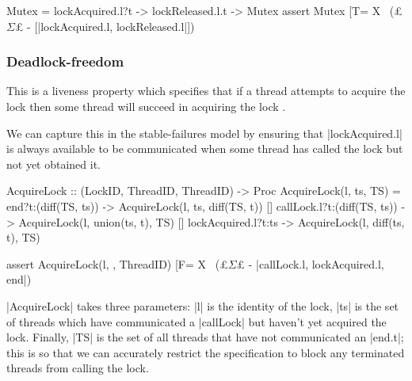   
  \begin{cspm}
Mutex = lockAcquired.l?t -> lockReleased.l.t -> Mutex
assert Mutex [T= 
          X \ (£$\Sigma$£ - [|lockAcquired.l, lockReleased.l|])
  \end{cspm}

\subsubsection{Deadlock-freedom}\label{deadlock-freedom}
This is a liveness property which specifies that if a thread attempts to acquire the lock then some thread will succeed in acquiring the lock \cite{TAoMP}. 

  
  

  We can capture this in the stable-failures model by ensuring that |lockAcquired.l| is always available to be communicated when some thread has called the lock but not yet obtained it. %

  \begin{cspm}
AcquireLock :: (LockID, {ThreadID}, {ThreadID}) -> Proc
AcquireLock(l, ts, TS) = 
     end?t:(diff(TS, ts)) -> AcquireLock(l, ts, diff(TS, {t})) 
  [] callLock.l?t:(diff(TS, ts)) -> AcquireLock(l, union(ts, {t}), TS)
  [] lockAcquired.l?t:ts -> AcquireLock(l, diff(ts, {t}), TS)

assert AcquireLock(l, {}, ThreadID) [F= 
          X \ (£$\Sigma$£ - {|callLock.l, lockAcquired.l, end|})
  \end{cspm}
  |AcquireLock| takes three parameters: |l| is the identity of the lock, |ts| is the set of threads which have communicated a |callLock| but haven't yet acquired the lock. Finally, |TS| is the set of all threads that have not communicated an |end.t|; this is so that we can accurately restrict the specification to block any terminated threads from calling the lock. 

